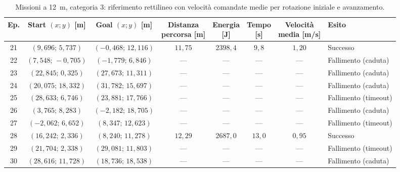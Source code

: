\begin{table}[H]
\centering
\caption{Missioni a 12~m, categoria 3: riferimento rettilineo con velocità comandate medie per rotazione iniziale e avanzamento.}
\label{tab:big-map-12m-baseline-cat3}
\begingroup
\fontsize{9}{11}\selectfont
\setlength{\tabcolsep}{2.5pt}
\renewcommand{\arraystretch}{1.2}
\begin{tabular}{@{}c cc cccc l@{}}
\toprule
Ep. & \shortstack{Start $(x;y)$\\{}[m]} & \shortstack{Goal $(x;y)$\\{}[m]} & \shortstack{Distanza\\percorsa [m]} & \shortstack{Energia\\{}[J]} & \shortstack{Tempo\\{}[s]} & \shortstack{Velocità\\media [m/s]} & Esito \\
\midrule
21 & $(9{,}696;\,5{,}737)$ & $(-0{,}468;\,12{,}116)$ & $11{,}75$ & $2398{,}4$ & $9{,}8$ & $1{,}20$ & Successo \\
22 & $(7{,}548;\,-0{,}705)$ & $(-1{,}779;\,6{,}846)$ & --- & --- & --- & --- & Fallimento (caduta) \\
23 & $(22{,}845;\,0{,}325)$ & $(27{,}673;\,11{,}311)$ & --- & --- & --- & --- & Fallimento (caduta) \\
24 & $(20{,}075;\,18{,}332)$ & $(31{,}782;\,15{,}697)$ & --- & --- & --- & --- & Fallimento (caduta) \\
25 & $(28{,}633;\,6{,}746)$ & $(23{,}881;\,17{,}766)$ & --- & --- & --- & --- & Fallimento (timeout) \\
26 & $(3{,}765;\,8{,}283)$ & $(-2{,}182;\,18{,}705)$ & --- & --- & --- & --- & Fallimento (caduta) \\
27 & $(-2{,}062;\,6{,}652)$ & $(8{,}347;\,12{,}623)$ & --- & --- & --- & --- & Fallimento (timeout) \\
28 & $(16{,}242;\,2{,}336)$ & $(8{,}240;\,11{,}278)$ & $12{,}29$ & $2687{,}0$ & $13{,}0$ & $0{,}95$ & Successo \\
29 & $(21{,}704;\,2{,}338)$ & $(29{,}081;\,11{,}803)$ & --- & --- & --- & --- & Fallimento (timeout) \\
30 & $(28{,}616;\,11{,}728)$ & $(18{,}736;\,18{,}538)$ & --- & --- & --- & --- & Fallimento (caduta) \\
\bottomrule
\end{tabular}
\endgroup
\end{table}

